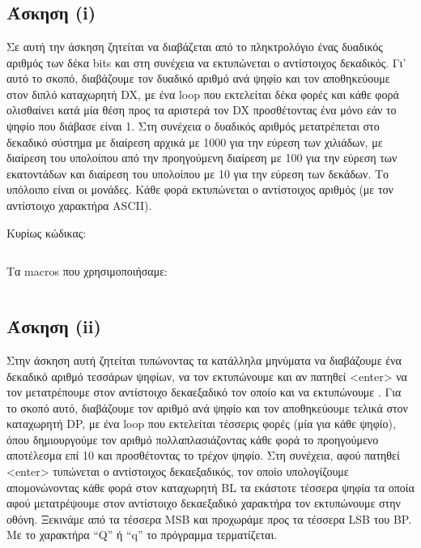 \documentclass[a4paper,10pt]{article} \usepackage{anysize}
\begin{document}


\section*{} 
\subsection*{Άσκηση (i)}

Σε αυτή την άσκηση ζητείται να διαβάζεται από το πληκτρολόγιο ένας δυαδικός
αριθμός των δέκα bits και στη συνέχεια να εκτυπώνεται ο αντίστοιχος δεκαδικός.
Γι' αυτό το σκοπό, διαβάζουμε τον δυαδικό αριθμό ανά ψηφίο και τον
αποθηκεύουμε στον διπλό καταχωρητή DX, με ένα loop που εκτελείται δέκα φορές
και κάθε φορά ολισθαίνει κατά μία θέση προς τα αριστερά τον DX προσθέτοντας
ένα μόνο εάν το ψηφίο που διάβασε είναι 1. Στη συνέχεια ο δυαδικός αριθμός
μετατρέπεται στο δεκαδικό σύστημα με  διαίρεση αρχικά με 1000 για την εύρεση
των χιλιάδων, με διαίρεση του υπολοίπου από την προηγούμενη διαίρεση με 100
για την εύρεση των εκατοντάδων και διαίρεση του υπολοίπου με 10 για την εύρεση
των δεκάδων. Το υπόλοιπο είναι οι μονάδες. Κάθε φορά εκτυπώνεται ο αντίστοιχος
αριθμός (με τον αντίστοιχο χαρακτήρα ASCII).

\noindent Κυρίως κώδικας:
\inputminted[linenos,obeytabs,fontsize=\footnotesize]{nasm}{files/1.asm}
Τα macros που χρησιμοποιήσαμε:
\inputminted[linenos,obeytabs,fontsize=\footnotesize]{nasm}{files/1.txt}
\subsection*{Άσκηση (ii)}
Στην άσκηση αυτή ζητείται τυπώνοντας τα κατάλληλα μηνύματα να διαβάζουμε ένα
δεκαδικό αριθμό τεσσάρων ψηφίων, να τον εκτυπώνουμε και αν πατηθεί <enter> να
τον μετατρέπουμε στον αντίστοιχο δεκαεξαδικό τον οποίο και να εκτυπώνουμε .
Για το σκοπό αυτό, διαβάζουμε τον αριθμό ανά ψηφίο και τον αποθηκεύουμε τελικά
στον καταχωρητή DP, με ένα loop που εκτελείται τέσσερις φορές (μία για κάθε
ψηφίο), όπου δημιουργούμε τον αριθμό πολλαπλασιάζοντας κάθε φορά το
προηγούμενο αποτέλεσμα επί 10 και προσθέτοντας το τρέχον ψηφίο. Στη συνέχεια,
αφού πατηθεί <enter> τυπώνεται ο αντίστοιχος δεκαεξαδικός, τον οποίο
υπολογίζουμε απομονώνοντας κάθε φορά στον καταχωρητή BL τα εκάστοτε τέσσερα
ψηφία τα οποία αφού μετατρέψουμε στον αντίστοιχο δεκαεξαδικό χαρακτήρα τον
εκτυπώνουμε στην οθόνη. Ξεκινάμε από τα τέσσερα MSB και προχωράμε προς τα
τέσσερα LSB του BP.  Με το χαρακτήρα “Q” ή “q” το πρόγραμμα τερματίζεται.
\end{document}
